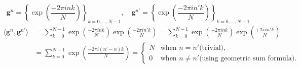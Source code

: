 \begin{Proof}
    \begin{equation*}
        \boldsymbol{g}^n = \left\{\exp\left({\frac{-2\pi ink}{N}}\right)\right\}_{k=0,\ldots,N-1}, \quad \boldsymbol{g}^{n'} = \left\{\exp\left({\frac{-2\pi in'k}{N}}\right)\right\}_{k=0,\ldots,N-1}
    \end{equation*}
    \begin{equation*}
    \begin{split} 
        \langle\boldsymbol{g}^n,\boldsymbol{g}^{n'}\rangle &= \sum_{k=0}^{N-1} \exp\left({\frac{-2\pi ink}{N}}\right)\overline{\exp\left({\frac{-2\pi in'k}{N}}\right)}
        = \sum_{k=0}^{N-1} \exp\left({\frac{-2\pi ink}{N}}\right)\exp\left({\frac{+2\pi in'k}{N}}\right)\\
        &= \sum_{k=0}^{N-1} \exp\left({\frac{-2\pi i(n'-n)k}{N}}\right)=
        \begin{cases}
            N & \text{when $n = n'$}\text{(trivial)},\\
            0 & \text{when $n\neq n'$}\text{(using geometric sum formula)}.
        \end{cases}
    \end{split}
\end{equation*}
    
\end{Proof}


